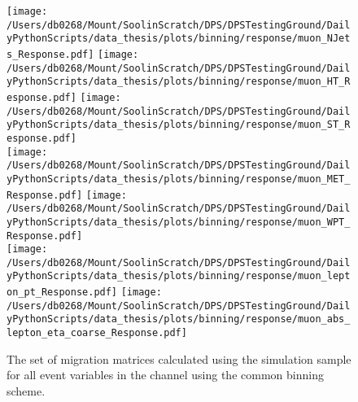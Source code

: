 \begin{figure}[hp]
	\centering
	\texttt{[image: /Users/db0268/Mount/SoolinScratch/DPS/DPSTestingGround/DailyPythonScripts/data\_thesis/plots/binning/response/muon\_NJets\_Response.pdf]} 
	\texttt{[image: /Users/db0268/Mount/SoolinScratch/DPS/DPSTestingGround/DailyPythonScripts/data\_thesis/plots/binning/response/muon\_HT\_Response.pdf]}
	\texttt{[image: /Users/db0268/Mount/SoolinScratch/DPS/DPSTestingGround/DailyPythonScripts/data\_thesis/plots/binning/response/muon\_ST\_Response.pdf]} \\
	\texttt{[image: /Users/db0268/Mount/SoolinScratch/DPS/DPSTestingGround/DailyPythonScripts/data\_thesis/plots/binning/response/muon\_MET\_Response.pdf]}
	\texttt{[image: /Users/db0268/Mount/SoolinScratch/DPS/DPSTestingGround/DailyPythonScripts/data\_thesis/plots/binning/response/muon\_WPT\_Response.pdf]} \\
	\texttt{[image: /Users/db0268/Mount/SoolinScratch/DPS/DPSTestingGround/DailyPythonScripts/data\_thesis/plots/binning/response/muon\_lepton\_pt\_Response.pdf]} 
	\texttt{[image: /Users/db0268/Mount/SoolinScratch/DPS/DPSTestingGround/DailyPythonScripts/data\_thesis/plots/binning/response/muon\_abs\_lepton\_eta\_coarse\_Response.pdf]} \\
	\caption[The set of migration matrices calculated using the \powhegpythia{} simulation sample for all event variables in the \muJets{} channel using the common binning scheme.]{The set of migration matrices calculated using the \powhegpythia{} simulation sample for all event variables in the \muJets{} channel using the common binning scheme.}
	\label{fig:ResponseMatricesMu}
\end{figure}
